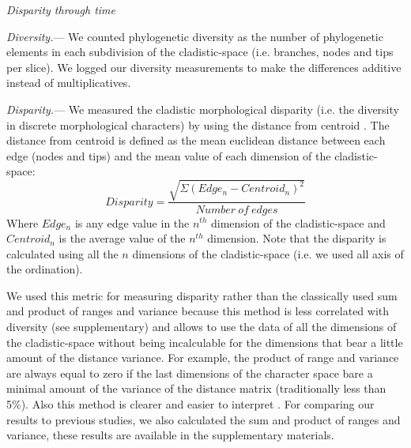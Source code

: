 \documentclass[12pt,letterpaper]{article}
\renewcommand{\subsection}[1]{%
\bigskip
\begin{center}
\begin{large}
\normalfont\itshape #1
\end{large}
\end{center}}
\renewcommand{\subsubsection}[1]{%
\vspace{2ex}
\noindent
\textit{#1.}---}
\begin{document}
\subsection{Disparity through time}
\subsubsection{Diversity}
We counted phylogenetic diversity as the number of phylogenetic elements in each subdivision of the cladistic-space (i.e. branches, nodes and tips per slice). We logged our diversity measurements to make the differences additive instead of multiplicatives.

\subsubsection{Disparity}
We measured the cladistic morphological disparity (i.e. the diversity in discrete morphological characters) by using the distance from centroid \citep{finlay2015morphological}. The distance from centroid is defined as the mean euclidean distance between each edge (nodes and tips) and the mean value of each dimension of the cladistic-space:
\begin{equation}
Disparity=\frac{\sqrt{\Sigma(Edge_{n}-Centroid_{n})^2}}{Number\ of\ edges}
\end{equation}
Where $Edge_{n}$ is any edge value in the $n^{th}$ dimension of the cladistic-space and $Centroid_{n}$ is the average value of the $n^{th}$ dimension. Note that the disparity is calculated using all the $n$ dimensions of the cladistic-space (i.e. we used all axis of the ordination).

We used this metric for measuring disparity rather than the classically used sum and product of ranges and variance \citep[e.g.][]{Wills1994,Foote29111996,Wesley-Hunt2005,Brusatte12092008,ruta2013} %
because this method is less correlated with diversity (see supplementary) and allows to use the data of all the dimensions of the cladistic-space without being incalculable for the dimensions that bear a little amount of the distance variance. For example, the product of range and variance are always equal to zero if the last dimensions of the character space bare a minimal amount of the variance of the distance matrix (traditionally less than 5\%). Also this method is clearer and easier to interpret \citep{finlay2015morphological}. For comparing our results to previous studies, we also calculated the sum and product of ranges and variance, these results are available in the supplementary materials.
\end{document}
